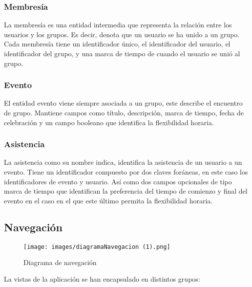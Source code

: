 \subsubsection{Membresía}
La membresía es una entidad intermedia que representa la relación entre los usuarios y los grupos. Es decir, denota que un usuario se ha unido a un grupo. Cada membresía tiene un identificador único, el identificador del usuario, el identificador del grupo, y una marca de tiempo de cuando el usuario se unió al grupo.

\subsubsection{Evento}
El entidad evento viene siempre asociada a un grupo, este describe el encuentro de grupo. Mantiene campos como título, descripción, marca de tiempo, fecha de celebración y un campo booleano que identifica la flexibilidad horaria.

\subsubsection{Asistencia}
La asistencia como su nombre indica, identifica la asistencia de un usuario a un evento. Tiene un identificador compuesto por dos claves foráneas, en este caso los identificadores de evento y usuario. Así como dos campos opcionales de tipo marca de tiempo que identifican la preferencia del tiempo de comienzo y final del evento en el caso en el que este último permita la flexibilidad horaria.

\begin{comment}
\subsection{Aspectos de Seguridad}
Es importante considerar aspectos de seguridad en el diseño de la aplicación. Por ejemplo, las contraseñas de los usuarios deben ser almacenadas de manera segura utilizando métodos de hash y sal. Además, debería haber autenticación y autorización adecuadas para asegurar que los usuarios solo puedan realizar acciones que les estén permitidas, como por ejemplo, un usuario solo puede eliminar un grupo si es el dueño de este.
\end{comment}

\subsection{Navegación}
\begin{figure}[H]
        \centering
        \texttt{[image: images/diagramaNavegacion (1).png]}
        \caption{Diagrama de navegación}
        \label{fig:diagramaER}
\end{figure}
La vistas de la aplicación se han encapsulado en distintos grupos:

